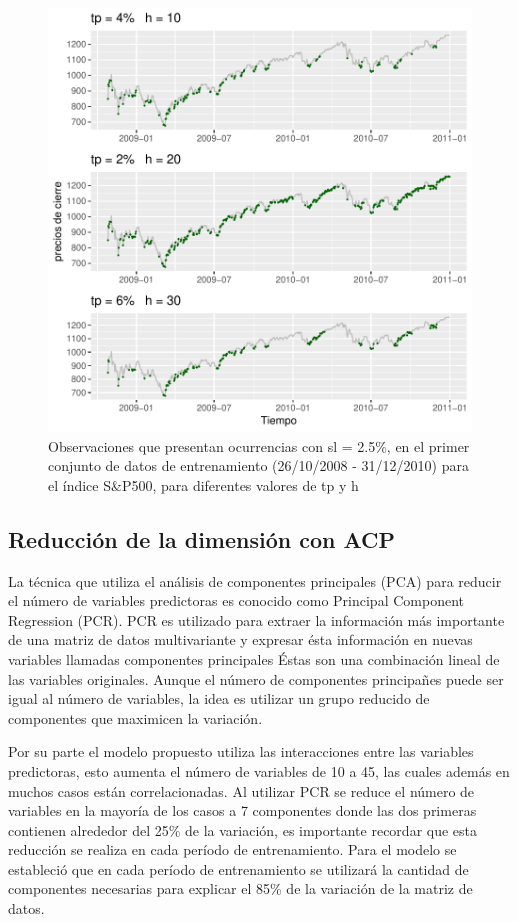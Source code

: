 \documentclass[a4paper,12pt]{Latex/Classes/PhDthesisPSnPDF}
\begin{document}
\begin{figure}[H]
\centering
\includegraphics{main-003}
\caption{Observaciones que presentan ocurrencias con sl = 2.5\%, en el primer conjunto de datos de entrenamiento (26/10/2008 - 31/12/2010) para el índice S\&P500, para diferentes valores de tp y h}
\end{figure}


\subsection{Reducción de la dimensión con ACP}

La técnica que utiliza el análisis de componentes principales (PCA) para reducir el número de variables predictoras es conocido como Principal Component Regression (PCR). PCR es utilizado para extraer la información más importante de una matriz de datos multivariante y expresar ésta información en nuevas variables llamadas componentes principales Éstas son una combinación lineal de las variables originales. Aunque el número de componentes principañes puede ser igual al número de variables, la idea es utilizar un grupo reducido de componentes que maximicen la variación.

Por su parte el modelo propuesto utiliza las interacciones entre las variables predictoras, esto aumenta el número de variables de 10 a 45, las cuales además en muchos casos están correlacionadas. Al utilizar PCR se reduce el número de variables en la mayoría de los casos a 7 componentes donde las dos primeras contienen alrededor del 25\% de la variación, es importante recordar que esta reducción se realiza en cada período de entrenamiento. Para el modelo se estableció que en cada período de entrenamiento se utilizará la cantidad de componentes necesarias para explicar el 85\% de la variación de la matriz de datos.
\end{document}

